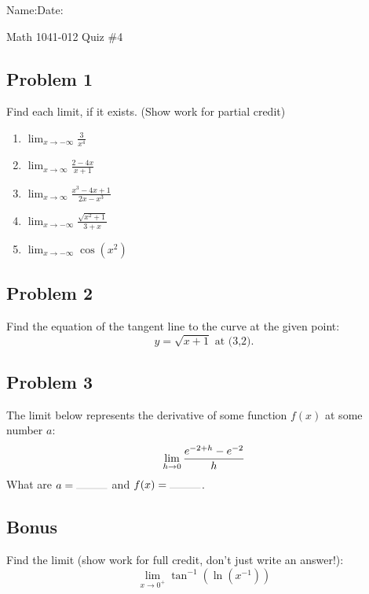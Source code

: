 \documentclass[10pt]{book}
\theoremstyle{definition}
\begin{document}
\begin{flushleft}
Name:\underline{\hspace{13cm}}Date:\underline{\hspace{2cm}}
\end{flushleft}
\begin{center}
{\Large Math 1041-012 \hspace{0.5cm} Quiz \#4}
\end{center}
\vspace{0.2 cm}
\subsection*{Problem 1}Find each limit, if it exists. (Show work for partial credit)
\begin{enumerate}[label=(\alph*)]
    \item $\displaystyle\lim_{x\rightarrow-\infty}\frac{3}{x^4}$\vspace{3cm}
    \item $\displaystyle\lim_{x\rightarrow\infty}\frac{2-4x}{x+1}$\vspace{3cm}
    \item $\displaystyle\lim_{x\rightarrow\infty}\frac{x^3-4x+1}{2x-x^3}$\vspace{3cm}
    \item $\displaystyle\lim_{x\rightarrow-\infty}\frac{\sqrt{x^2+1}}{3+x}$\vspace{3cm}
    \item $\displaystyle\lim_{x\rightarrow-\infty}\cos (x^2)$
\end{enumerate}
\clearpage
\subsection*{Problem 2} Find the equation of the tangent line to the curve at the given point:
\[
y=\sqrt{x+1}\textrm{ at (3,2).}
\]
\vspace{6cm}
\subsection*{Problem 3} The limit below represents the derivative of some function $f(x)$ at some number $a$:
\[
\lim_{h\rightarrow 0}\frac{e^{-2+h}-e^{-2}}{h}\vspace{0.5cm}
\]
What are $a=\rule{1cm}{0.05mm}$ and $f(x)=\rule{1cm}{0.05mm} $.
\vspace{4cm}
\subsection*{Bonus}
Find the limit (show work for full credit, don't just write an answer!):
\[
\lim_{x\rightarrow 0^+}\tan^{-1}\left(\ln\left(x^{-1}\right)\right)
\]
\end{document}
